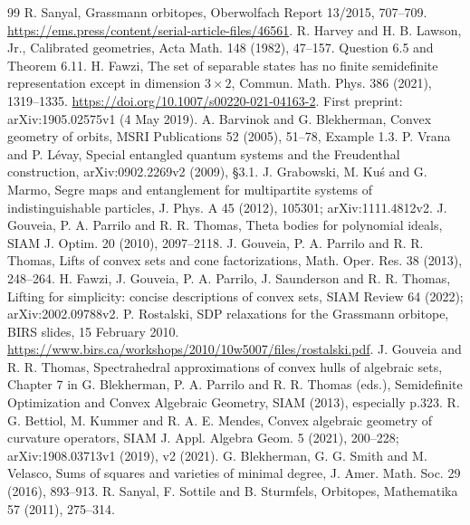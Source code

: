 \documentclass[11pt]{article}
\begin{document}
\begin{thebibliography}{99}
 R. Sanyal, Grassmann orbitopes, Oberwolfach Report 13/2015,
707--709. \url{https://ems.press/content/serial-article-files/46561}.
 R. Harvey and H. B. Lawson, Jr., Calibrated geometries,
Acta Math. 148 (1982), 47--157. Question 6.5 and Theorem 6.11.
 H. Fawzi, The set of separable states has no finite
semidefinite representation except in dimension $3\times2$,
Commun. Math. Phys. 386 (2021), 1319--1335.
\url{https://doi.org/10.1007/s00220-021-04163-2}.
First preprint: arXiv:1905.02575v1 (4 May 2019).
 A. Barvinok and G. Blekherman, Convex geometry of orbits,
MSRI Publications 52 (2005), 51--78, Example 1.3.
 P. Vrana and P. L\'evay, Special entangled quantum systems
and the Freudenthal construction, arXiv:0902.2269v2 (2009), \S3.1.
 J. Grabowski, M. Ku\'s and G. Marmo, Segre maps and
entanglement for multipartite systems of indistinguishable particles,
J. Phys. A 45 (2012), 105301; arXiv:1111.4812v2.
 J. Gouveia, P. A. Parrilo and R. R. Thomas, Theta bodies for
polynomial ideals, SIAM J. Optim. 20 (2010), 2097--2118.
 J. Gouveia, P. A. Parrilo and R. R. Thomas, Lifts of convex
sets and cone factorizations, Math. Oper. Res. 38 (2013), 248--264.
 H. Fawzi, J. Gouveia, P. A. Parrilo, J. Saunderson and
R. R. Thomas, Lifting for simplicity: concise descriptions of convex sets,
SIAM Review 64 (2022); arXiv:2002.09788v2.
 P. Rostalski, SDP relaxations for the Grassmann orbitope,
BIRS slides, 15 February 2010.
\url{https://www.birs.ca/workshops/2010/10w5007/files/rostalski.pdf}.
 J. Gouveia and R. R. Thomas, Spectrahedral approximations
of convex hulls of algebraic sets, Chapter 7 in G. Blekherman, P. A. Parrilo
and R. R. Thomas (eds.), Semidefinite Optimization and Convex Algebraic
Geometry, SIAM (2013), especially p.323.
 R. G. Bettiol, M. Kummer and R. A. E. Mendes, Convex
algebraic geometry of curvature operators, SIAM J. Appl. Algebra Geom.
5 (2021), 200--228; arXiv:1908.03713v1 (2019), v2 (2021).
 G. Blekherman, G. G. Smith and M. Velasco, Sums of squares
and varieties of minimal degree, J. Amer. Math. Soc. 29 (2016), 893--913.
 R. Sanyal, F. Sottile and B. Sturmfels, Orbitopes,
Mathematika 57 (2011), 275--314.
\end{thebibliography}
\end{document}
